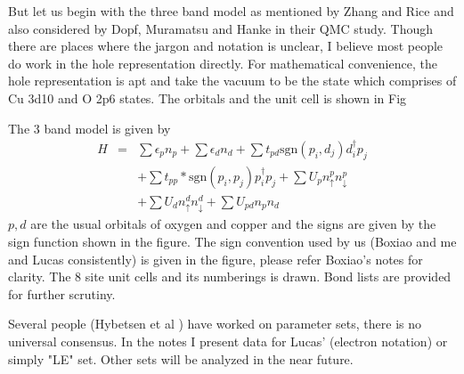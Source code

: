 \documentclass[prl,12pt,onecolumn,nofootinbib,notitlepage,english,superscriptaddress]{revtex4-1}
\begin{document}
But let us begin with the three band model as mentioned by
Zhang and Rice and also considered by Dopf, Muramatsu and
Hanke in their QMC study. Though there are places where the
jargon and notation is unclear, I believe most people do work
in the hole representation directly. For mathematical convenience,
the hole representation is apt and take the vacuum to
be the state which comprises of Cu 3d10 and O 2p6 states. The
orbitals and the unit cell is shown in Fig

The 3 band model is given by 
\begin{eqnarray}
	H &=& \sum \epsilon_p n_p + \sum \epsilon_d n_d + \sum t_{pd} \text{sgn}(p_i,d_j) d_i^{\dagger} p_j \\ 
	  && + \sum t_{pp} * \text{sgn}(p_i,p_j) p_i^{\dagger} p_j + \sum U_p n^{p}_{\uparrow} n^{p}_{\downarrow} \\ 
	  && + \sum U_d n^{d}_{\uparrow} n^{d}_{\downarrow} + \sum U_{pd} n_p n_d 
\end{eqnarray}
$p,d$ are the usual orbitals of oxygen and copper and the signs are given by the sign function shown in the figure.  
The sign convention used by us (Boxiao and me and Lucas consistently) is given in the figure, please refer Boxiao's notes for clarity.
The 8 site unit cells and its numberings is drawn. Bond lists are provided for further scrutiny.

Several people (Hybetsen et al ) have worked on parameter sets, there is no universal consensus. In the notes I present 
data for Lucas' (electron notation) or simply "LE" set. Other sets will be analyzed in the near future. 
\end{document}

